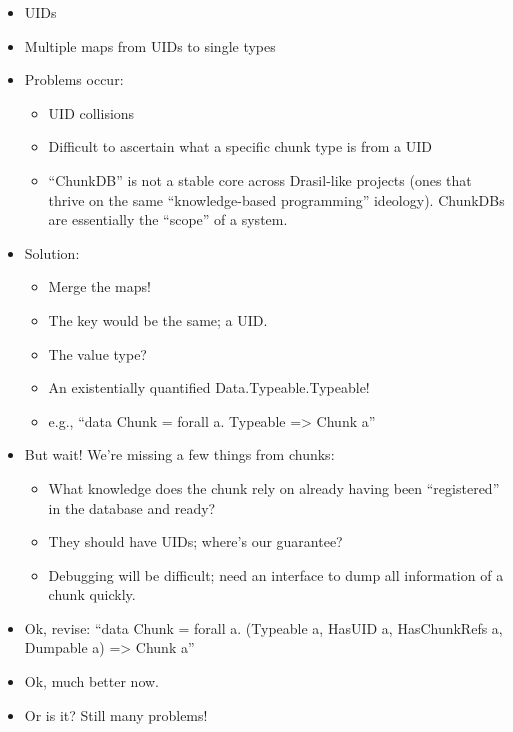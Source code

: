 \begin{itemize}
    \item UIDs
    \item Multiple maps from UIDs to single types
    \item Problems occur:
          \begin{itemize}
              \item UID collisions
              \item Difficult to ascertain what a specific chunk type is from a
                    UID
              \item ``ChunkDB'' is not a stable core across Drasil-like projects
                    (ones that thrive on the same ``knowledge-based programming''
                    ideology). ChunkDBs are essentially the ``scope'' of a system.
          \end{itemize}
    \item Solution:
          \begin{itemize}
              \item Merge the maps!
              \item The key would be the same; a UID.
              \item The value type?
              \item An existentially quantified Data.Typeable.Typeable!
              \item e.g., ``data Chunk = forall a. Typeable => Chunk a''
          \end{itemize}
    \item But wait! We're missing a few things from chunks:
          \begin{itemize}
              \item What knowledge does the chunk rely on already having been
                    ``registered'' in the database and ready?
              \item They should have UIDs; where's our guarantee?
              \item Debugging will be difficult; need an interface to dump all
                    information of a chunk quickly.
          \end{itemize}
    \item Ok, revise: ``data Chunk = forall a. (Typeable a, HasUID a,
          HasChunkRefs a, Dumpable a) => Chunk a''
    \item Ok, much better now.
    \item Or is it? Still many problems!

\end{itemize}
